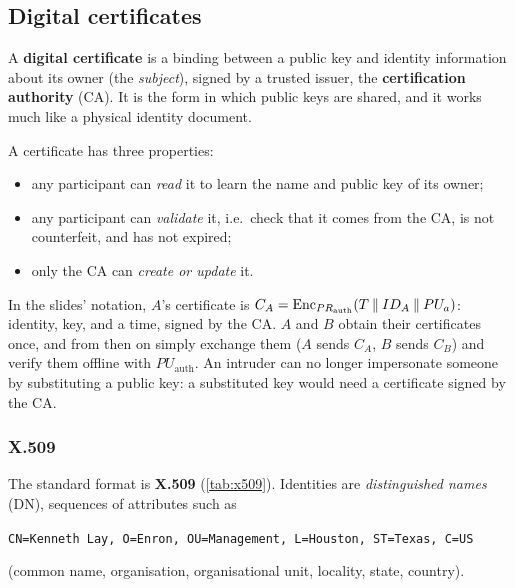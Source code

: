 \subsection{Digital certificates}

\begin{definition}
A \textbf{digital certificate} is a binding between a public key and identity information about its owner (the \emph{subject}), signed by a trusted issuer, the \textbf{certification authority} (CA). It is the form in which public keys are shared, and it works much like a physical identity document.
\end{definition}

A certificate has three properties:
\begin{itemize}
    \item any participant can \emph{read} it to learn the name and public key of its owner;
    \item any participant can \emph{validate} it, i.e.\ check that it comes from the CA, is not counterfeit, and has not expired;
    \item only the CA can \emph{create or update} it.
\end{itemize}
In the slides' notation, $A$'s certificate is $C_A = \operatorname{Enc}_{PR_{\mathrm{auth}}}(T \mathbin{\|} ID_A \mathbin{\|} PU_a)$: identity, key, and a time, signed by the CA. $A$ and $B$ obtain their certificates once, and from then on simply exchange them ($A$ sends $C_A$, $B$ sends $C_B$) and verify them offline with $PU_{\mathrm{auth}}$. An intruder can no longer impersonate someone by substituting a public key: a substituted key would need a certificate signed by the CA.

\subsubsection{X.509}

The standard format is \textbf{X.509} (\cref{tab:x509}). Identities are \emph{distinguished names} (DN), sequences of attributes such as
\begin{center}
\small\texttt{CN=Kenneth Lay, O=Enron, OU=Management, L=Houston, ST=Texas, C=US}
\end{center}
(common name, organisation, organisational unit, locality, state, country).

